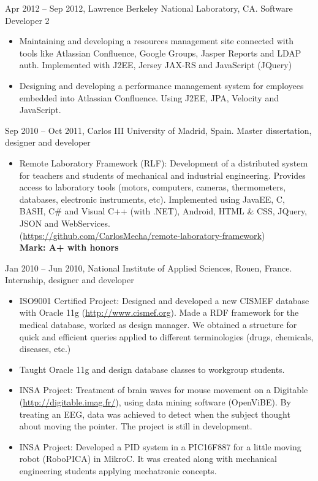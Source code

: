 
\experience
  {Apr 2012 – Sep 2012, Lawrence Berkeley National Laboratory, CA.}
  {Software Developer 2}
  {\vspace{-1em}\begin{itemize}
    \itemsep3pt \parskip0pt 
    \item Maintaining and developing a resources management site
    connected with tools like Atlassian Confluence, Google Groups, Jasper
    Reports and LDAP auth. Implemented with J2EE, Jersey JAX-RS and
    JavaScript (JQuery)
    \item Designing and developing a performance management system for
    employees embedded into Atlassian Confluence. Using J2EE, JPA,
    Velocity and JavaScript.
  \end{itemize}}

\experience
  {Sep 2010 – Oct 2011, Carlos III University of Madrid, Spain.}
  {Master dissertation, designer and developer}
  {\vspace{-1em}\begin{itemize}
    \itemsep3pt \parskip0pt 
    \item Remote Laboratory Framework (RLF): Development of a distributed
    system for teachers and students of mechanical and industrial
    engineering. Provides access to laboratory tools (motors, computers,
    cameras, thermometers, databases, electronic instruments, etc).
    Implemented using JavaEE, C, BASH, C\# and Visual C++ (with .NET),
    Android, HTML \& CSS, JQuery, JSON and WebServices.\\
    (\url{https://github.com/CarlosMecha/remote-laboratory-framework})\\
    \textbf{Mark: A+ with honors}
  \end{itemize}}

\experience
  {Jan 2010 – Jun 2010, National Institute of Applied Sciences, Rouen, France.}
  {Internship, designer and developer}
  {\vspace{-1em}\begin{itemize}
    \itemsep3pt \parskip0pt 
    \item ISO9001 Certified Project: Designed and developed a new CISMEF
    database with Oracle 11g (\url{http://www.cismef.org}). Made a RDF
    framework for the medical database, worked as design manager. We obtained a
    structure for quick and efficient queries applied to different
    terminologies (drugs, chemicals, diseases, etc.)
    \item Taught Oracle 11g and design database classes to workgroup students.
    \item INSA Project: Treatment of brain waves for mouse movement on a Digitable
    (\url{http://digitable.imag.fr/}), using data mining software (OpenViBE).
    By treating an EEG, data was achieved to detect when the subject thought
    about moving the pointer. The project is still in development.
    \item INSA Project: Developed a PID system in a PIC16F887 for a little moving robot
    (RoboPICA) in MikroC. It was created along with mechanical engineering
    students applying mechatronic concepts.
  \end{itemize}}

